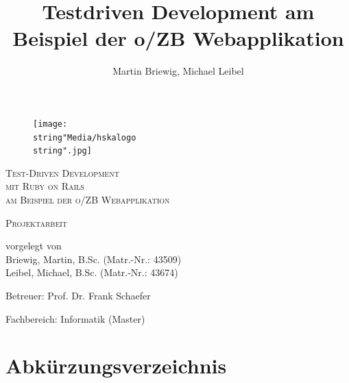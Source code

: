 \documentclass[12pt,             %
               a4paper,          %
               listof=totoc,     %
               index=totoc,      %
               bibliography=totoc,%
               oneside,         %
               BCOR1cm,          %
               english   %
               ]{scrbook}
\title{Testdriven Development am Beispiel der o/ZB Webapplikation}
\author{Martin Briewig, Michael Leibel}
\begin{document}
\pagestyle{empty}
\begin{center}

\begin{figure}[h]
	\begin{center}
		\texttt{[image: \\string"Media/hskalogo\\string".jpg]}
	\end{center}
	\label{fig:hska_logo}
\end{figure} 

\vspace{5\baselineskip}

\textsc{\Huge Test-Driven Development\\ mit Ruby on Rails}\\[0.25cm]
\textsc{\large am Beispiel der o/ZB Webapplikation}\\[1.5cm]


\vspace{2\baselineskip}

\textsc{\LARGE Projektarbeit}\\[1.5cm]


\vspace{5\baselineskip}

vorgelegt von\\
Briewig, Martin, B.Sc. (Matr.-Nr.: 43509)\\
Leibel, Michael, B.Sc. (Matr.-Nr.: 43674)

\vspace{\baselineskip}

Betreuer: Prof. Dr. Frank Schaefer

Fachbereich: Informatik (Master)
\end{center}

\clearpage{}


\tableofcontents{}

\clearpage{}

\chapter*{Abkürzungsverzeichnis}

\begin{acronym}[SQL]
\end{acronym}

\newpage
\end{document}
